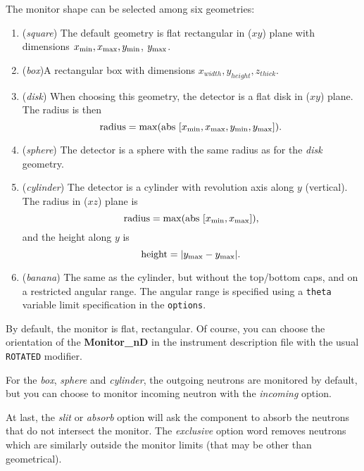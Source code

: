 The monitor shape can be selected among six geometries:
\begin{enumerate}
\item{({\it square}) The default geometry is flat rectangular in ($xy$)
    plane with dimensions $x_{\rm min}, x_{\rm max}, y_{\rm min}$,
    $y_{\rm max}$.}
\item{({\it box})A rectangular box with dimensions $x_{width}, y_{height}, z_{thick}$.}
\item{({\it disk}) When choosing this geometry, the detector is a flat
    disk in ($xy$) plane. The radius is then
    \begin{equation}
      \mbox{radius} = \max ( \mbox{abs } [ x_{\rm min}, x_{\rm max}, y_{\rm
        min}, y_{\rm max} ] ).
    \end{equation}
    }
\item{({\it sphere}) The detector is a sphere with the same radius as
    for the {\it disk} geometry.}
\item{({\it cylinder}) The detector is a cylinder with revolution axis
    along $y$ (vertical). The radius in ($xz$) plane is
    \begin{equation}
      \mbox{radius} =  \max ( \mbox{abs } [ x_{\rm min}, x_{\rm max} ] ),
    \end{equation}
    and the height along $y$ is
    \begin{equation}
      \mbox{height} =  | y_{\rm max} - y_{\rm max} |.
    \end{equation}
    }
\item{({\it banana}) The same as the cylinder, but without the top/bottom caps, and on a restricted angular range. The angular range is specified using a \verb+theta+ variable limit specification in the \verb+options+.}
\end{enumerate}

By default, the monitor is flat, rectangular. Of course, you can choose
the orientation of the {\bf Monitor\_nD} in the instrument description
file with the usual \texttt{ROTATED} modifier.

For the {\it box}, {\it sphere} and {\it cylinder}, the outgoing neutrons are
monitored by default, but you can choose to monitor incoming neutron
with the {\it incoming} option.

At last, the {\it slit} or {\it absorb} option will ask the component to
absorb the neutrons that do not intersect the monitor. The {\it exclusive} option word removes neutrons which are similarly outside the monitor limits (that may be other than geometrical).

